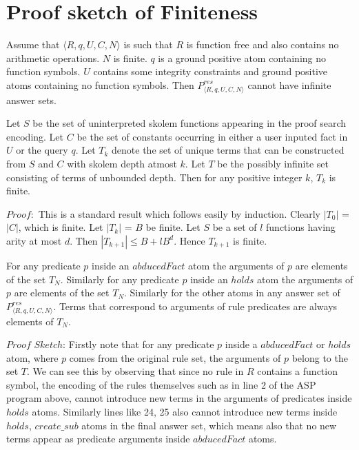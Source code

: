 \section{Proof sketch of Finiteness}\label{sec:proof_finiteness}

\begin{theorem}[Finiteness]\label{thm:finiteness}
Assume that $\langle R,q,U,C,N \rangle$ is such that $R$ is function free and
also contains no arithmetic operations. $N$ is finite. $q$ is a ground
positive atom containing no function symbols. $U$ contains some integrity
constraints and ground positive atoms containing no function symbols. Then
$P_{\langle R,q,U,C,N \rangle}^{res}$ cannot have infinite answer sets. 
\end{theorem}

\begin{lemma}
Let $S$ be the set of uninterpreted skolem functions appearing in the proof
search encoding. Let $C$ be the set of constants occurring in either a user
inputed fact in $U$ or the query $q$. Let $T_{k}$ denote the set of unique
terms that can be constructed from $S$ and $C$ with skolem depth atmost
$k$. Let $T$  be the possibly infinite set consisting of terms of unbounded
depth. Then for any positive integer $k$, $T_{k}$ is finite.
\end{lemma}

$Proof:$ This is a standard result which follows easily by induction. Clearly $|T_{0}|$ = $|C|$, which is finite. Let $|T_{k}|$ = $B$ be finite. Let $S$ be a set of $l$ functions having arity at most $d$. Then $|T_{k+1}|\leq B + lB^{d}$. Hence $T_{k+1}$ is finite.  

\begin{lemma}
 For any predicate $p$ inside an $abducedFact$ atom the arguments of $p$ are elements of the set $T_{N}$. Similarly for any predicate $p$ inside an $holds$ atom the arguments of $p$ are elements of the set $T_{N}$. Similarly for the other atoms in any answer set of $P_{\langle R,q,U,C,N \rangle}^{res}$. Terms that correspond to arguments of rule predicates are always elements of $T_{N}$.
\end{lemma}

$Proof$ $Sketch$: Firstly note that for any predicate $p$ inside a
$abducedFact$ or $holds$ atom, where $p$ comes from the original rule set, the
arguments of $p$ belong to the set $T$. We can see this by observing that
since no rule in $R$ contains a function symbol, the encoding of the rules
themselves such as in line 2 of the ASP program above, cannot introduce new
terms in the arguments of predicates inside $holds$ atoms. Similarly lines
like 24, 25 also cannot introduce new terms inside $holds$, $create\_sub$
atoms in the final answer set, which means also that no new terms appear as
predicate arguments inside $abducedFact$ atoms. 

